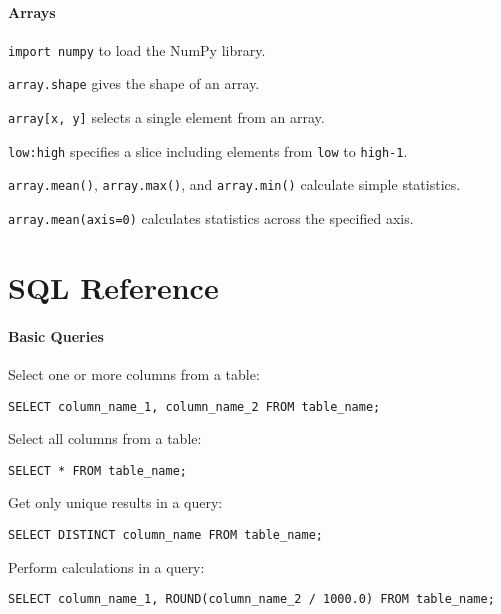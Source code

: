\documentclass{book}
\begin{document}
\mbox{}\paragraph{Arrays}

\begin{swcitemize}
\item
  \texttt{import numpy} to load the NumPy library.
\item
  \texttt{array.shape} gives the shape of an array.
\item
  \texttt{array{[}x, y{]}} selects a single element from an array.
\item
  \texttt{low:high} specifies a slice including elements from
  \texttt{low} to \texttt{high-1}.
\item
  \texttt{array.mean()}, \texttt{array.max()}, and \texttt{array.min()}
  calculate simple statistics.
\item
  \texttt{array.mean(axis=0)} calculates statistics across the specified
  axis.
\end{swcitemize}

\section{SQL Reference}

\mbox{}\paragraph{Basic Queries}

Select one or more columns from a table:

\begin{Verbatim}
SELECT column_name_1, column_name_2 FROM table_name;
\end{Verbatim}

Select all columns from a table:

\begin{Verbatim}
SELECT * FROM table_name;
\end{Verbatim}

Get only unique results in a query:

\begin{Verbatim}
SELECT DISTINCT column_name FROM table_name;
\end{Verbatim}

Perform calculations in a query:

\begin{Verbatim}
SELECT column_name_1, ROUND(column_name_2 / 1000.0) FROM table_name;
\end{Verbatim}
\end{document}
